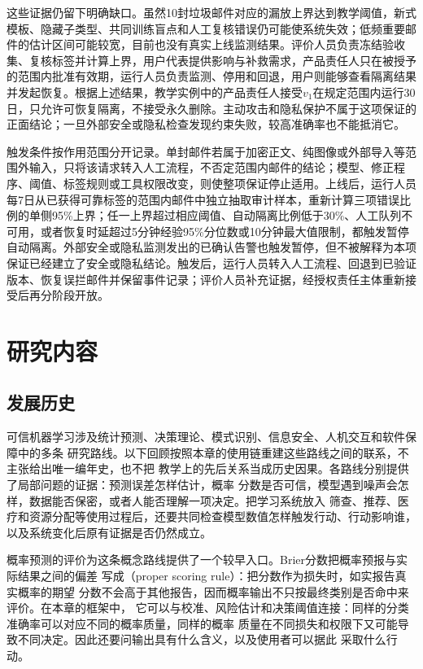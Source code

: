 这些证据仍留下明确缺口。虽然10封垃圾邮件对应的漏放上界达到教学阈值，新式模板、隐藏子类型、共同训练盲点和人工复核错误仍可能使系统失效；低频重要邮件的估计区间可能较宽，目前也没有真实上线监测结果。评价人员负责冻结验收集、复核标签并计算上界，用户代表提供影响与补救需求，产品责任人只在被授予的范围内批准有效期，运行人员负责监测、停用和回退，用户则能够查看隔离结果并发起恢复。根据上述结果，教学实例中的产品责任人接受$v_1$在规定范围内运行30日，只允许可恢复隔离，不接受永久删除。主动攻击和隐私保护不属于这项保证的正面结论；一旦外部安全或隐私检查发现约束失败，较高准确率也不能抵消它。

触发条件按作用范围分开记录。单封邮件若属于加密正文、纯图像或外部导入等范围外输入，只将该请求转入人工流程，不否定范围内邮件的结论；模型、修正程序、阈值、标签规则或工具权限改变，则使整项保证停止适用。上线后，运行人员每7日从已获得可靠标签的范围内邮件中独立抽取审计样本，重新计算三项错误比例的单侧95\%上界；任一上界超过相应阈值、自动隔离比例低于30\%、人工队列不可用，或者恢复时延超过5分钟经验95\%分位数或10分钟最大值限制，都触发暂停自动隔离。外部安全或隐私监测发出的已确认告警也触发暂停，但不被解释为本项保证已经建立了安全或隐私结论。触发后，运行人员转入人工流程、回退到已验证版本、恢复误拦邮件并保留事件记录；评价人员补充证据，经授权责任主体重新接受后再分阶段开放。

\section{研究内容}
\label{sec:trust-research-content}

\subsection{发展历史}

可信机器学习涉及统计预测、决策理论、模式识别、信息安全、人机交互和软件保障中的多条
研究路线。以下回顾按照本章的使用链重建这些路线之间的联系，不主张给出唯一编年史，也不把
教学上的先后关系当成历史因果。各路线分别提供了局部问题的证据：预测误差怎样估计，概率
分数是否可信，模型遇到噪声会怎样，数据能否保密，或者人能否理解一项决定。把学习系统放入
筛查、推荐、医疗和资源分配等使用过程后，还要共同检查模型数值怎样触发行动、行动影响谁，
以及系统变化后原有证据是否仍然成立。

概率预测的评价为这条概念路线提供了一个较早入口。Brier分数把概率预报与实际结果之间的偏差
写成（proper scoring rule）：把分数作为损失时，如实报告真实概率的期望
分数不会高于其他报告，因而概率输出不只按最终类别是否命中来评价。在本章的框架中，
它可以与校准、风险估计和决策阈值连接：同样的分类准确率可以对应不同的概率质量，同样的概率
质量在不同损失和权限下又可能导致不同决定。因此还要问输出具有什么含义，以及使用者可以据此
采取什么行动。

